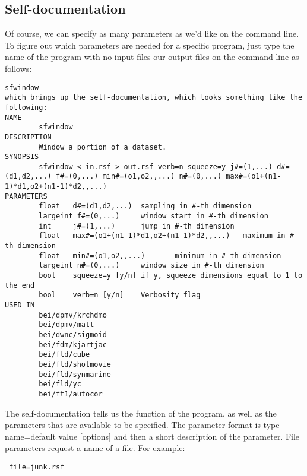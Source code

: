 \subsection{Self-documentation}
Of course, we can specify as many parameters as we'd like on the command line. To figure out which parameters are needed for a specific program, just type the name of the program with no input files our output files on the command line as follows:
\begin{verbatim}
sfwindow
which brings up the self-documentation, which looks something like the following:
NAME
        sfwindow
DESCRIPTION
        Window a portion of a dataset. 
SYNOPSIS
        sfwindow < in.rsf > out.rsf verb=n squeeze=y j#=(1,...) d#=(d1,d2,...) f#=(0,...) min#=(o1,o2,,...) n#=(0,...) max#=(o1+(n1-1)*d1,o2+(n1-1)*d2,,...)
PARAMETERS
        float   d#=(d1,d2,...)  sampling in #-th dimension 
        largeint f#=(0,...)     window start in #-th dimension 
        int     j#=(1,...)      jump in #-th dimension 
        float   max#=(o1+(n1-1)*d1,o2+(n1-1)*d2,,...)   maximum in #-th dimension 
        float   min#=(o1,o2,,...)       minimum in #-th dimension 
        largeint n#=(0,...)     window size in #-th dimension 
        bool    squeeze=y [y/n] if y, squeeze dimensions equal to 1 to the end 
        bool    verb=n [y/n]    Verbosity flag
USED IN
        bei/dpmv/krchdmo
        bei/dpmv/matt
        bei/dwnc/sigmoid
        bei/fdm/kjartjac
        bei/fld/cube
        bei/fld/shotmovie
        bei/fld/synmarine
        bei/fld/yc
        bei/ft1/autocor
\end{verbatim}
The self-documentation tells us the function of the program, as well as the parameters that are available to be specified. The parameter format is type - name=default value [options] and then a short description of the parameter. File parameters request a name of a file. For example: \begin{verbatim} file=junk.rsf \end{verbatim}

